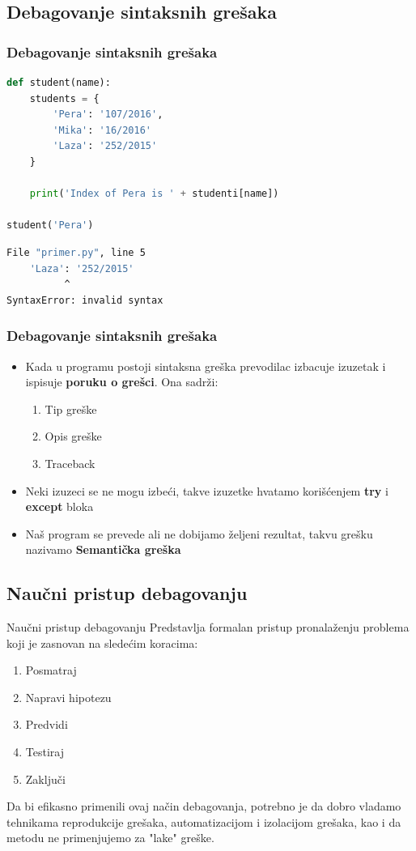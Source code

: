 \documentclass{beamer}
\begin{document}
\subsection{Debagovanje sintaksnih grešaka}
\begin{frame}[fragile]
\frametitle{Debagovanje sintaksnih grešaka}
\begin{exampleblock}{}
\begin{lstlisting}[language = python]
def student(name):
    students = {
        'Pera': '107/2016',
        'Mika': '16/2016'
        'Laza': '252/2015'
    }

    print('Index of Pera is ' + studenti[name])

student('Pera')
\end{lstlisting}
\end{exampleblock}
\begin{exampleblock}{}
\begin{lstlisting}[language = bash]
  File "primer.py", line 5
    'Laza': '252/2015'
          ^
SyntaxError: invalid syntax
\end{lstlisting}
\end{exampleblock}
\end{frame}
\begin{frame}
\frametitle{Debagovanje sintaksnih grešaka}
\begin{itemize}
\item Kada u programu postoji sintaksna greška prevodilac izbacuje izuzetak i ispisuje \textbf{poruku o grešci}. Ona sadrži:
\begin{enumerate}
    \item Tip greške
    \item Opis greške
    \item Traceback
\end{enumerate}
\item Neki izuzeci se ne mogu izbeći, takve izuzetke hvatamo korišćenjem \textbf{try} i \textbf{except} bloka
\item Naš program se prevede ali ne dobijamo željeni rezultat, takvu grešku nazivamo \textbf{Semantička greška}
\end{itemize}
\end{frame}
\subsection{Naučni pristup debagovanju}
\begin{frame}{Naučni pristup debagovanju}
Predstavlja formalan pristup pronalaženju problema koji je zasnovan na sledećim koracima:
\begin{enumerate}
    \item Posmatraj
    \item Napravi hipotezu
    \item Predvidi
    \item Testiraj
    \item Zaključi
\end{enumerate}
Da bi efikasno primenili ovaj način debagovanja, potrebno je da dobro vladamo tehnikama reprodukcije grešaka, automatizacijom i izolacijom grešaka, kao i da metodu ne primenjujemo za "lake" greške.
\end{frame}
\end{document}
